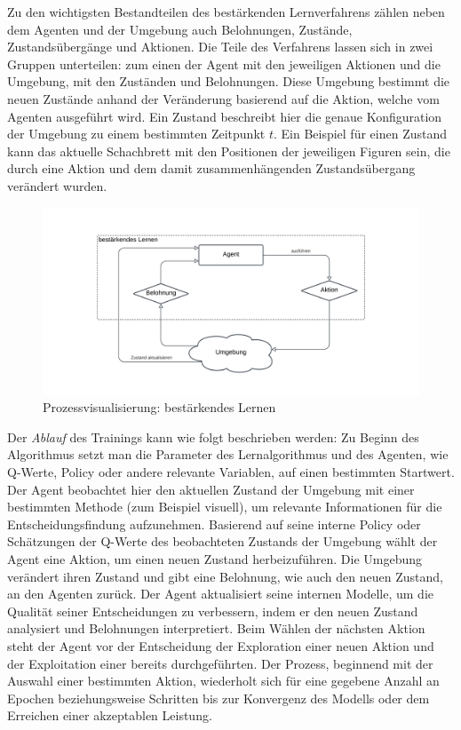 Zu den wichtigsten Bestandteilen des bestärkenden Lernverfahrens zählen neben dem Agenten und der Umgebung auch Belohnungen, Zustände, Zustandsübergänge und Aktionen. Die Teile des Verfahrens lassen sich in zwei Gruppen unterteilen: zum einen der Agent mit den jeweiligen Aktionen und die Umgebung, mit den Zuständen und Belohnungen. Diese Umgebung bestimmt die neuen Zustände anhand der Veränderung basierend auf die Aktion, welche vom Agenten ausgeführt wird. Ein Zustand beschreibt hier die genaue Konfiguration der Umgebung zu einem bestimmten Zeitpunkt $t$. Ein Beispiel für einen Zustand kann das aktuelle Schachbrett mit den Positionen der jeweiligen Figuren sein, die durch eine Aktion und dem damit zusammenhängenden Zustandsübergang verändert wurden.
\begin{figure}[H]\label{img:reinforcementworkflow}
	\hspace{-10mm}
	\centering
	\includegraphics[width=0.8\linewidth]{Bilder/ReinforcementLearning.png}
	\caption{Prozessvisualisierung: bestärkendes Lernen}
\end{figure}
Der \textit{Ablauf} des Trainings kann wie folgt beschrieben werden: Zu Beginn des Algorithmus setzt man die Parameter des Lernalgorithmus und des Agenten, wie Q-Werte, Policy oder andere relevante Variablen, auf einen bestimmten Startwert. Der Agent beobachtet hier den aktuellen Zustand der Umgebung mit einer bestimmten Methode (zum Beispiel visuell), um relevante Informationen für die Entscheidungsfindung aufzunehmen. Basierend auf seine interne Policy oder Schätzungen der Q-Werte des beobachteten Zustands der Umgebung wählt der Agent eine Aktion, um einen neuen Zustand herbeizuführen. Die Umgebung verändert ihren Zustand und gibt eine Belohnung, wie auch den neuen Zustand, an den Agenten zurück. Der Agent aktualisiert seine internen Modelle, um die Qualität seiner Entscheidungen zu verbessern, indem er den neuen Zustand analysiert und Belohnungen interpretiert. Beim Wählen der nächsten Aktion steht der Agent vor der Entscheidung der Exploration einer neuen Aktion und der Exploitation einer bereits durchgeführten. Der Prozess, beginnend mit der Auswahl einer bestimmten Aktion, wiederholt sich für eine gegebene Anzahl an Epochen beziehungsweise Schritten bis zur Konvergenz des Modells oder dem Erreichen einer akzeptablen Leistung.

